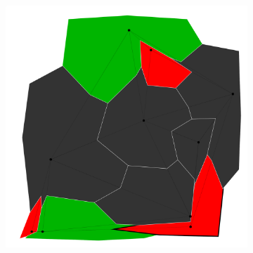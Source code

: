 \documentclass{article}
\begin{document}
\begin{figure}[h!]
\begin{subfigure}{0.18\textwidth}
				\caption{}
				\label{btd}
			\end{subfigure}
			\;
			\begin{subfigure}{0.18\textwidth}
				\centering
				\includegraphics[width=\textwidth]{images/sequences/simple_backtracking/bt_simple_I00007}
				\caption{}
				\label{bte}
			\end{subfigure} \\
			

\end{figure}
\end{document}
